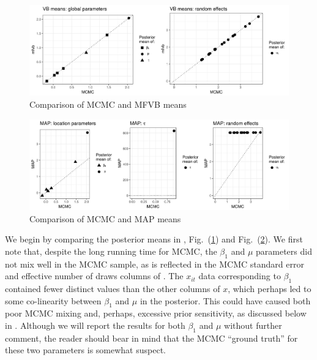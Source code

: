 \documentclass{article}\usepackage[]{graphicx}\usepackage[]{color}
\newenvironment{knitrout}{}{} %
\theoremstyle{plain}
\theoremstyle{definition}
\theoremstyle{plain}
\theoremstyle{plain}
\theoremstyle{plain}
\theoremstyle{plain}
\newcommand{\fig}[1]{Fig.~(\ref{fig:#1})}
\begin{document}
\begin{knitrout}
\color{fgcolor}\begin{figure}[!h]

{\centering \includegraphics[width=0.98\linewidth,height=0.343\linewidth]{figure/LogitGLMMMCMCComparisonMeans-1} 

}

\caption[Comparison of MCMC and MFVB means]{Comparison of MCMC and MFVB means}\label{fig:LogitGLMMMCMCComparisonMeans}
\end{figure}


\end{knitrout}

\begin{knitrout}
\color{fgcolor}\begin{figure}[!h]

{\centering \includegraphics[width=0.98\linewidth,height=0.343\linewidth]{figure/LogitGLMMMapComparisonMeans-1} 

}

\caption[Comparison of MCMC and MAP means]{Comparison of MCMC and MAP means}\label{fig:LogitGLMMMapComparisonMeans}
\end{figure}


\end{knitrout}

We begin by comparing the posterior means in ,
\fig{LogitGLMMMCMCComparisonMeans} and \fig{LogitGLMMMapComparisonMeans}.
We first note that, despite the long running time for MCMC, the $\beta_{1}$
and $\mu$ parameters did not mix well in the MCMC sample, as is reflected
in the MCMC standard error and effective number of draws columns of
. The $x_{it}$ data corresponding to
$\beta_{1}$ contained fewer distinct values than the other columns
of $x$, which perhaps led to some co-linearity between $\beta_{1}$
and $\mu$ in the posterior. This could have caused both poor MCMC
mixing and, perhaps, excessive prior sensitivity, as discussed below
in . Although we will report the
results for both $\beta_{1}$ and $\mu$ without further comment,
the reader should bear in mind that the MCMC ``ground truth'' for
these two parameters is somewhat suspect.
\end{document}
